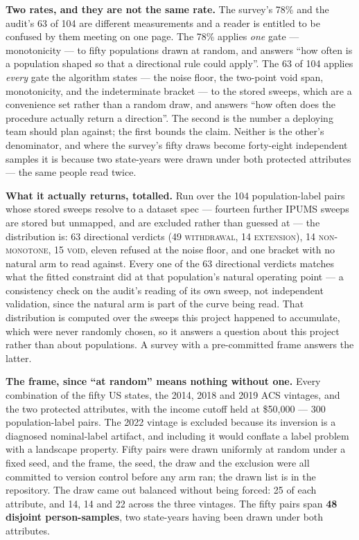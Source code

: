 \documentclass[conference]{IEEEtran}
\begin{document}
\textbf{Two rates, and they are not the same rate.} The survey's 78\% and the audit's 63 of 104 are different measurements and a reader is entitled to be confused by them meeting on
one page. The 78\% applies \emph{one} gate --- monotonicity --- to fifty populations drawn at
random, and answers ``how often is a population shaped so that a directional rule could
apply''. The 63 of 104 applies \emph{every} gate the algorithm states --- the noise floor, the
two-point void span, monotonicity, and the indeterminate bracket --- to the stored sweeps,
which are a convenience set rather than a random draw, and answers ``how often does the
procedure actually return a direction''. The second is the number a deploying team should
plan against; the first bounds the claim. Neither is the other's denominator, and where the
survey's fifty draws become forty-eight independent samples it is because two state-years were
drawn under both protected attributes --- the same people read twice.

\textbf{What it actually returns, totalled.} Run over the 104 population-label pairs whose stored sweeps resolve to a dataset spec --- fourteen further IPUMS sweeps are stored but unmapped, and are excluded rather than guessed at --- the distribution is: 63 directional verdicts (49 \textsc{withdrawal}, 14 \textsc{extension}), 14 \textsc{non-monotone}, 15 \textsc{void}, eleven refused at the noise floor, and one bracket with no natural arm to read against. Every one of the 63 directional verdicts matches what the fitted constraint did at that population's natural operating
point --- a consistency check on the audit's reading of its own sweep, not independent
validation, since the natural arm is part of the curve being read. That distribution is computed over the sweeps this project happened to accumulate, which
were never randomly chosen, so it answers a question about this project rather than about
populations. A survey with a pre-committed frame answers the latter.

\textbf{The frame, since ``at random'' means nothing without one.} Every combination of the
fifty US states, the 2014, 2018 and 2019 ACS vintages, and the two protected attributes, with
the income cutoff held at \$50{,}000 --- 300 population-label pairs. The 2022 vintage is
excluded because its inversion is a diagnosed nominal-label artifact, and including it would
conflate a label problem with a landscape property. Fifty pairs were drawn uniformly at
random under a fixed seed, and the frame, the seed, the draw and the exclusion were all
committed to version control before any arm ran; the drawn list is in the repository. The
draw came out balanced without being forced: 25 of each attribute, and 14, 14 and 22 across
the three vintages. The fifty pairs span \textbf{48 disjoint person-samples}, two state-years
having been drawn under both attributes.
\end{document}

